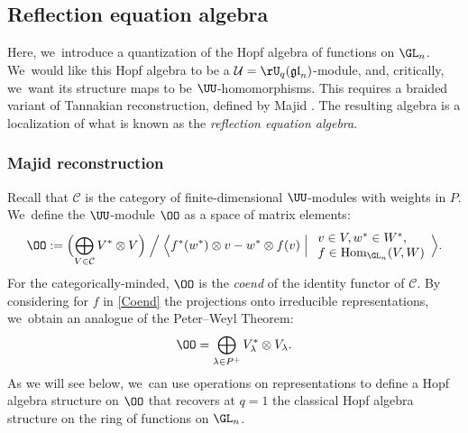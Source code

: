 \subsection{Reflection equation algebra}
Here, we~introduce a quantization of the Hopf algebra of functions on $\GL_n$. We~would like this Hopf algebra to be a $\mathcal{U}=\rU_q(\mathfrak{gl}_n)$-module, and, critically, we~want its structure maps to be $\UU$-homomorphisms.
This requires a braided variant of Tannakian reconstruction, defined by Majid \cite{MajidBraided}.
The resulting algebra is a localization of what is known as the \textit{reflection equation algebra}.

\subsubsection{Majid reconstruction}
Recall that $\mathcal{C}$ is the category of finite-dimensional $\UU$-modules with weights in $P$. We~define the $\UU$-module $\OO$ as a space of matrix elements:
\begin{equation}
\OO:=\Bigl(\bigoplus_{V\in\mathcal{C}}V^*\otimes V \Bigr)\Bigm/\Bigl\langle f^*(w^*)\otimes v-w^*\otimes f(v)\Bigm|
\begin{array}{l}
v\in V, w^*\in W^*,\\
f\in\mathrm{Hom}_{\GL_n}(V,W)
\end{array}
\Bigr\rangle.
\label{Coend}
\end{equation}
For the categorically-minded, $\OO$ is the \textit{coend} of the identity functor of $\mathcal{C}$.
By considering for $f$ in \eqref{Coend} the projections onto irreducible representations, we~obtain an analogue of the Peter--Weyl Theorem:
\begin{equation}
\OO=\bigoplus_{\lambda\in P^+} V_\lambda^*\otimes V_\lambda.
\label{qPeterWeyl}
\end{equation}
As we will see below, we~can use operations on representations to define a Hopf algebra structure on $\OO$ that recovers at $q=1$ the classical Hopf algebra structure on the ring of functions on $\GL_n$.

